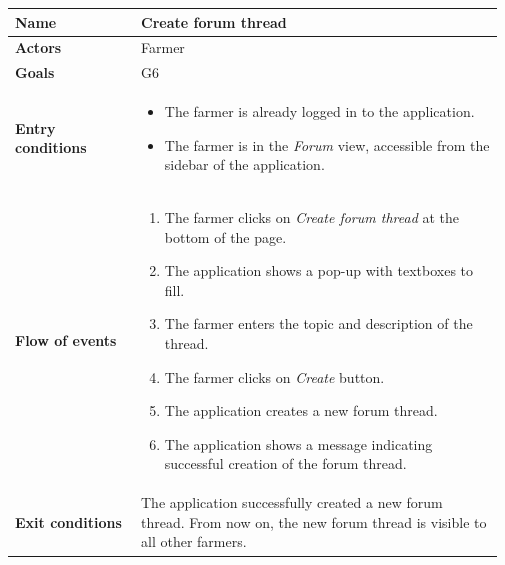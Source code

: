 \begin{table}[H]
    \centering
	\begin{tabular}{@{}p{0.25\linewidth} p{0.72\linewidth}@{}}
\toprule
		\textbf{Name}               & Create forum thread\\
		\midrule
		\textbf{Actors}             & Farmer\\
		\midrule
		\textbf{Goals}              & G6 \\
		\midrule
		
		\textbf{Entry conditions}   & \begin{itemize}[leftmargin=.4cm,noitemsep,topsep=0pt,before=\vspace{-3mm},after=\vspace{-4mm}]
		    \item The farmer is already logged in to the application.
		    \item The farmer is in the \textit{Forum} view, accessible from the sidebar of the application.
		\end{itemize}\\
		\midrule
		
		\textbf{Flow of events}     & \begin{enumerate}[leftmargin=.4cm,noitemsep,topsep=0pt,before=\vspace{-3mm},after=\vspace{-4mm}]
		    \item The farmer clicks on \textit{Create forum thread} at the bottom of the page.
		    \item The application shows a pop-up with textboxes to fill.
		    \item The farmer enters the topic and description of the thread.
		    \item The farmer clicks on \textit{Create} button.
		    \item The application creates a new forum thread.
		    \item The application shows a message indicating successful creation of the forum thread.
		\end{enumerate}\\
		\midrule
		\textbf{Exit conditions}    & The application successfully created a new forum thread. From now on, the new forum thread is visible to all other farmers. \\
		\midrule
		

\end{tabular}
\end{table}
